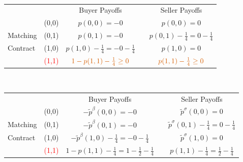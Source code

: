 \documentclass[12pt,letterpaper]{article}           %
\begin{document}
$ $

\newpage


\begin{table}[]
	\begin{tabular}{lcccc}
		&                            & Buyer Payoffs         &                       & Seller Payoffs        \\ \cline{3-3} \cline{5-5} 
		& \multicolumn{1}{c|}{(0,0)} & \multicolumn{1}{c|}{$p(0,0)= -0$} & \multicolumn{1}{c|}{} & \multicolumn{1}{c|}{$p(0,0)=  0$} \\ \cline{3-3} \cline{5-5} 
		Matching & \multicolumn{1}{c|}{(0,1)} & \multicolumn{1}{c|}{$p(0,1)= -0$} & \multicolumn{1}{c|}{} & \multicolumn{1}{c|}{$p(0,1) -\frac{1}{4}= 0 -\frac{1}{4}$}  \\ \cline{3-3} \cline{5-5} 
		Contract& \multicolumn{1}{c|}{(1,0)} & \multicolumn{1}{c|}{$ p(1,0) - \frac{1}{4}= - 0 - \frac{1}{4}$} & \multicolumn{1}{c|}{} & \multicolumn{1}{c|}{$p(1,0)=  0$} \\ \cline{3-3} \cline{5-5} 
		& \multicolumn{1}{c|}{\textcolor{red}{(1,1)}} & \multicolumn{1}{c|}{$ \textcolor{red}{1 - p(1,1) - \frac{1}{4}\geq0}$} & \multicolumn{1}{c|}{} & \multicolumn{1}{c|}{$\textcolor{red}{p(1,1) - \frac{1}{4}\geq 0}$} \\ \cline{3-3} \cline{5-5} 
	\end{tabular}
\end{table}


$ $

\newpage


\begin{table}[]
	\begin{tabular}{lcccc}
		&                            & Buyer Payoffs         &                       & Seller Payoffs        \\ \cline{3-3} \cline{5-5} 
		& \multicolumn{1}{c|}{(0,0)} & \multicolumn{1}{c|}{$-\tilde{p}^\beta(0,0)= -0$} & \multicolumn{1}{c|}{} & \multicolumn{1}{c|}{$\tilde{p}^\sigma(0,0)=  0$} \\ \cline{3-3} \cline{5-5} 
		Matching & \multicolumn{1}{c|}{(0,1)} & \multicolumn{1}{c|}{$-\tilde{p}^\beta(0,1)= -0$} & \multicolumn{1}{c|}{} & \multicolumn{1}{c|}{$\tilde{p}^\sigma(0,1) -\frac{1}{4}= 0 -\frac{1}{4}$}  \\ \cline{3-3} \cline{5-5} 
		Contract& \multicolumn{1}{c|}{(1,0)} & \multicolumn{1}{c|}{$ -\tilde{p}^\beta(1,0) - \frac{1}{4}= - 0 - \frac{1}{4}$} & \multicolumn{1}{c|}{} & \multicolumn{1}{c|}{$\tilde{p}^\sigma(1,0)=  0$} \\ \cline{3-3} \cline{5-5} 
		& \multicolumn{1}{c|}{\textcolor{red}{(1,1)}} & \multicolumn{1}{c|}{$  1 -p(1,1) - \frac{1}{4} = 1 - \frac{1}{2}- \frac{1}{4}$} & \multicolumn{1}{c|}{} & \multicolumn{1}{c|}{$ p(1,1) - \frac{1}{4}= \frac{1}{2}- \frac{1}{4}$} \\ \cline{3-3} \cline{5-5} 
	\end{tabular}
\end{table}
\end{document}
